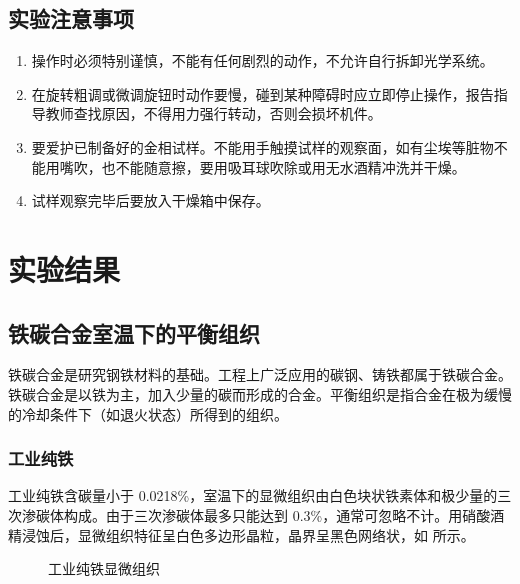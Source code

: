     \subsection{实验注意事项}
        \begin{enumerate}
            \item 操作时必须特别谨慎，不能有任何剧烈的动作，不允许自行拆卸光学系统。
            \item 在旋转粗调或微调旋钮时动作要慢，碰到某种障碍时应立即停止操作，报告指导教师查找原因，不得用力强行转动，否则会损坏机件。
            \item 要爱护已制备好的金相试样。不能用手触摸试样的观察面，如有尘埃等脏物不能用嘴吹，也不能随意擦，要用吸耳球吹除或用无水酒精冲洗并干燥。
            \item 试样观察完毕后要放入干燥箱中保存。
        \end{enumerate}
\section{实验结果}
    \subsection{铁碳合金室温下的平衡组织}
    铁碳合金是研究钢铁材料的基础。工程上广泛应用的碳钢、铸铁都属于铁碳合金。铁碳合金是以铁为主，加入少量的碳而形成的合金。平衡组织是指合金在极为缓慢的冷却条件下（如退火状态）所得到的组织。\par
    \subsubsection{工业纯铁}
    工业纯铁含碳量小于 0.0218\%，室温下的显微组织由白色块状铁素体和极少量的三次渗碳体构成。由于三次渗碳体最多只能达到 0.3\%，通常可忽略不计。用硝酸酒精浸蚀后，显微组织特征呈白色多边形晶粒，晶界呈黑色网络状，如 所示。
    \begin{figure}[!ht]
        \hspace{20pt}
        \hspace{20pt}
        \caption{工业纯铁显微组织\label{fig:n1}}
    \end{figure}

